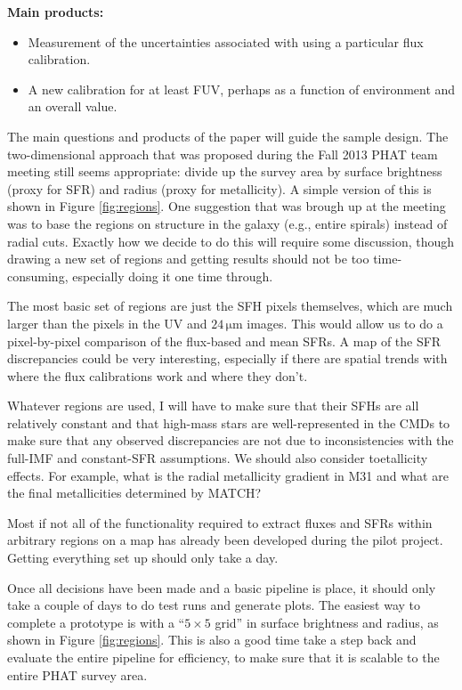 \documentclass[preprint,11pt]{aastex}
\begin{document}
\textbf{Main products:}
\begin{itemize}
\item Measurement of the uncertainties associated with using a particular flux
    calibration.
\item A new calibration for at least FUV, perhaps as a function of environment
    and an overall value.
\end{itemize}

The main questions and products of the paper will guide the sample design. The
two-dimensional approach that was proposed during the Fall 2013 PHAT team
meeting still seems appropriate: divide up the survey area by surface
brightness (proxy for SFR) and radius (proxy for metallicity). A simple version
of this is shown in Figure \ref{fig:regions}. One suggestion that was brough up
at the meeting was to base the regions on structure in the galaxy (e.g., entire
spirals) instead of radial cuts. Exactly how we decide to do this will require
some discussion, though drawing a new set of regions and getting results should
not be too time-consuming, especially doing it one time through.

The most basic set of regions are just the SFH pixels themselves, which are
much larger than the pixels in the UV and $24\,\mathrm{\mu m}$ images. This
would allow us to do a pixel-by-pixel comparison of the flux-based and mean
SFRs. A map of the SFR discrepancies could be very interesting, especially if
there are spatial trends with where the flux calibrations work and where they
don't.

Whatever regions are used, I will have to make sure that their SFHs are all
relatively constant and that high-mass stars are well-represented in the CMDs
to make sure that any observed discrepancies are not due to inconsistencies
with the full-IMF and constant-SFR assumptions. We should also consider
toetallicity effects. For example, what is the radial metallicity gradient in
M31 and what are the final metallicities determined by MATCH?

Most if not all of the functionality required to extract fluxes and SFRs within
arbitrary regions on a map has already been developed during the pilot project.
Getting everything set up should only take a day.

Once all decisions have been made and a basic pipeline is place, it should only
take a couple of days to do test runs and generate plots. The easiest way to
complete a prototype is with a ``$5\times 5$ grid'' in surface brightness and
radius, as shown in Figure \ref{fig:regions}. This is also a good time take a
step back and evaluate the entire pipeline for efficiency, to make sure that it
is scalable to the entire PHAT survey area.
\end{document}
